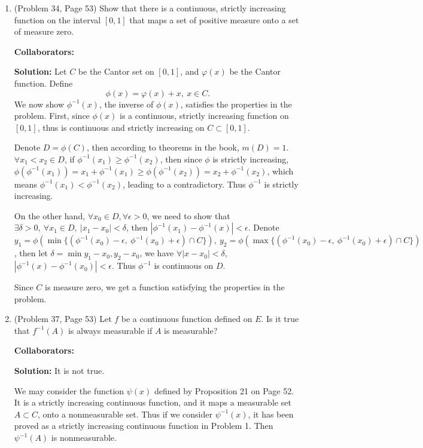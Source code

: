 \documentclass{article}%
\begin{document}
\begin{enumerate}
\item  (Problem 34, Page 53) Show that there is a continuous, strictly increasing function on the interval $[0, 1]$ that maps a
set of positive measure onto a set of measure zero.


\bigskip
\textbf{Collaborators:}\\
\smallskip
 
\textbf{Solution:}
Let $C$ be the Cantor set on $[0, 1]$, and $\varphi(x)$ be the Cantor function. Define
$$
\phi(x) = \varphi(x)+x, ~x\in C.
$$
We now show $\phi^{-1}(x)$, the inverse of $\phi(x)$, satisfies the properties in the problem.
First, since $\phi(x)$ is a continuous, strictly increasing function on $[0, 1]$, thus is continuous and strictly increasing on $C\subset [0, 1]$.

Denote $D = \phi(C)$, then according to theorems in the book, $m(D) = 1$. $\forall x_1 < x_2\in D$, if $\phi^{-1}(x_1) \ge \phi^{-1}(x_2)$, then since $\phi$ is strictly increasing, $\phi(\phi^{-1}(x_1)) = x_1+\phi^{-1}(x_1) \ge \phi(\phi^{-1}(x_2)) = x_2+\phi^{-1}(x_2)$, which means $\phi^{-1}(x_1) < \phi^{-1}(x_2)$, leading to a contradictory. Thus $\phi^{-1}$ is strictly increasing.

On the other hand, $\forall x_0 \in D, \forall \epsilon > 0$, we need to show that $\exists\delta > 0, ~\forall x_1\in D, ~|x_1-x_{0}| < \delta$, then $|\phi^{-1}(x_1)-\phi^{-1}(x)| < \epsilon$. Denote $y_1 = \phi(\min\{(\phi^{-1}(x_0)-\epsilon, ~\phi^{-1}(x_0)+\epsilon)\cap C\}), ~y_2 = \phi(\max\{(\phi^{-1}(x_0)-\epsilon, ~\phi^{-1}(x_0)+\epsilon)\cap C\})$, then let $\delta = \min{y_1-x_0, y_2-x_0}$, we have $\forall |x-x_0|< \delta$, $|\phi^{-1}(x)-\phi^{-1}(x_0)| < \epsilon$. Thus $\phi^{-1}$ is continuous on $D$.

Since $C$ is measure zero, we get a function satisfying the properties in the problem.
\bigskip

\item (Problem 37, Page 53) Let $f$ be a continuous function defined on $E$. Is it true that $f^{-1}(A)$ is always measurable if $A$ is measurable?


\bigskip
\textbf{Collaborators:}\\
\smallskip
 
\textbf{Solution:} It is not true. 

We may consider the function $\psi(x)$ defined by Proposition 21 on Page 52. It is a strictly increasing continuous function, and it maps a measurable set $A\subset C$, onto a nonmeasurable set. Thus if we consider $\psi^{-1}(x)$, it has been proved as a strictly increasing continuous function in Problem 1. Then $\psi^{-1}(A)$ is nonmeasurable.


\end{enumerate}
\end{document}
